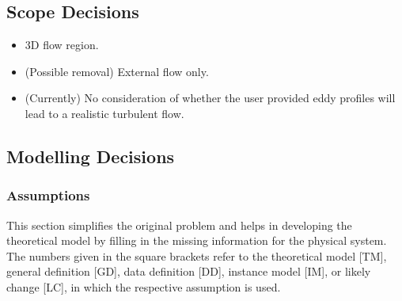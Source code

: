 \documentclass[12pt]{article}
\begin{document}

\subsection{Scope Decisions}
\begin{itemize}
  \item 3D flow region.
  \item (Possible removal) External flow only.
  \item (Currently) No consideration of whether the user provided eddy profiles will lead to a realistic turbulent flow.
\end{itemize}

\subsection{Modelling Decisions}


\subsubsection{Assumptions} \label{sec_assumpt}


This section simplifies the original problem and helps in developing the
theoretical model by filling in the missing information for the physical system.
The numbers given in the square brackets refer to the theoretical model [TM],
general definition [GD], data definition [DD], instance model [IM], or likely
change [LC], in which the respective assumption is used.
\end{document}
